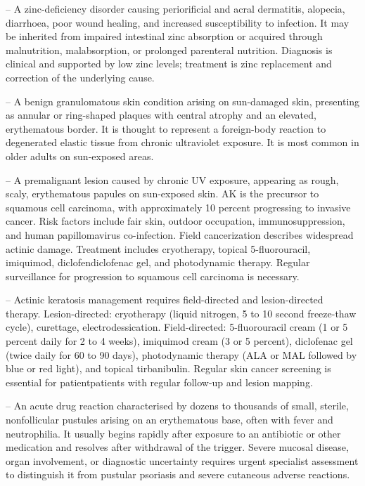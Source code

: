 -- A zinc-deficiency disorder causing periorificial and acral dermatitis, alopecia, diarrhoea, poor wound healing, and increased susceptibility to infection. It may be inherited from impaired intestinal zinc absorption or acquired through malnutrition, malabsorption, or prolonged parenteral nutrition. Diagnosis is clinical and supported by low zinc levels; treatment is zinc replacement and correction of the underlying cause.

-- A benign granulomatous skin condition arising on sun-damaged skin, presenting as annular or ring-shaped plaques with central atrophy and an elevated, erythematous border. It is thought to represent a foreign-body reaction to degenerated elastic tissue from chronic ultraviolet exposure. It is most common in older adults on sun-exposed areas.

-- A premalignant lesion caused by chronic UV exposure, appearing as rough, scaly, erythematous papules on sun-exposed skin. AK is the precursor to squamous cell carcinoma, with approximately 10 percent progressing to invasive cancer. Risk factors include fair skin, outdoor occupation, immunosuppression, and human papillomavirus co-infection. Field cancerization describes widespread actinic damage. Treatment includes cryotherapy, topical 5-fluorouracil, imiquimod, diclofendiclofenac gel, and photodynamic therapy. Regular surveillance for progression to squamous cell carcinoma is necessary.

-- Actinic keratosis management requires field-directed and lesion-directed therapy. Lesion-directed: cryotherapy (liquid nitrogen, 5 to 10 second freeze-thaw cycle), curettage, electrodessication. Field-directed: 5-fluorouracil cream (1 or 5 percent daily for 2 to 4 weeks), imiquimod cream (3 or 5 percent), diclofenac gel (twice daily for 60 to 90 days), photodynamic therapy (ALA or MAL followed by blue or red light), and topical tirbanibulin. Regular skin cancer screening is essential for patientpatients with regular follow-up and lesion mapping.

-- An acute drug reaction characterised by dozens to thousands of small, sterile, nonfollicular pustules arising on an erythematous base, often with fever and neutrophilia. It usually begins rapidly after exposure to an antibiotic or other medication and resolves after withdrawal of the trigger. Severe mucosal disease, organ involvement, or diagnostic uncertainty requires urgent specialist assessment to distinguish it from pustular psoriasis and severe cutaneous adverse reactions.

